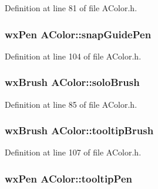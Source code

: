 Definition at line 81 of file A\+Color.\+h.

\subsubsection[{\texorpdfstring{snap\+Guide\+Pen}{snapGuidePen}}]{\setlength{\rightskip}{0pt plus 5cm}wx\+Pen A\+Color\+::snap\+Guide\+Pen\hspace{0.3cm}{\ttfamily [static]}}\hypertarget{class_a_color_aba299a723fba676837624634673a075f}{}\label{class_a_color_aba299a723fba676837624634673a075f}


Definition at line 104 of file A\+Color.\+h.

\subsubsection[{\texorpdfstring{solo\+Brush}{soloBrush}}]{\setlength{\rightskip}{0pt plus 5cm}wx\+Brush A\+Color\+::solo\+Brush\hspace{0.3cm}{\ttfamily [static]}}\hypertarget{class_a_color_aa9c19b58ca913c1de6095726f948c2da}{}\label{class_a_color_aa9c19b58ca913c1de6095726f948c2da}


Definition at line 85 of file A\+Color.\+h.

\subsubsection[{\texorpdfstring{tooltip\+Brush}{tooltipBrush}}]{\setlength{\rightskip}{0pt plus 5cm}wx\+Brush A\+Color\+::tooltip\+Brush\hspace{0.3cm}{\ttfamily [static]}}\hypertarget{class_a_color_a9ce00f8c3989de47d75b643dd36734fe}{}\label{class_a_color_a9ce00f8c3989de47d75b643dd36734fe}


Definition at line 107 of file A\+Color.\+h.

\subsubsection[{\texorpdfstring{tooltip\+Pen}{tooltipPen}}]{\setlength{\rightskip}{0pt plus 5cm}wx\+Pen A\+Color\+::tooltip\+Pen\hspace{0.3cm}{\ttfamily [static]}}\hypertarget{class_a_color_a608f78268295b262d6157a4a41e2cc68}{}\label{class_a_color_a608f78268295b262d6157a4a41e2cc68}


